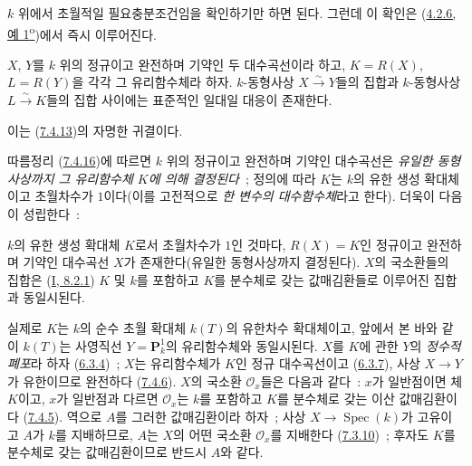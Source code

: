 
$k$ 위에서 초월적일 필요충분조건임을 확인하기만 하면 된다. 그런데 이 확인은
(\hyperref[II.4.2.6-ko]{4.2.6, 예 1\textsuperscript{o}})에서
즉시 이루어진다.

\begin{corollary}[7.4.16]
\label{II.7.4.16-ko}
$X$, $Y$를 $k$ 위의 정규이고 완전하며 기약인 두 대수곡선이라 하고,
$K=R(X)$, $L=R(Y)$을 각각 그 유리함수체라 하자. $k$-동형사상
$X\xrightarrow{\sim}Y$들의 집합과 $k$-동형사상
$L\xrightarrow{\sim}K$들의 집합 사이에는 표준적인 일대일 대응이
존재한다.
\end{corollary}

이는 (\hyperref[II.7.4.13-ko]{7.4.13})의 자명한 귀결이다.

\begin{env}[7.4.17]
\label{II.7.4.17-ko}
따름정리 (\hyperref[II.7.4.16-ko]{7.4.16})에 따르면 $k$ 위의 정규이고
완전하며 기약인 대수곡선은 \emph{유일한 동형사상까지 그 유리함수체
$K$에 의해 결정된다}~; 정의에 따라 $K$는 $k$의 유한 생성 확대체이고
초월차수가 $1$이다(이를 고전적으로 \emph{한 변수의 대수함수체}라고
한다). 더욱이 다음이 성립한다~:
\end{env}

\begin{proposition}[7.4.18]
\label{II.7.4.18-ko}
$k$의 유한 생성 확대체 $K$로서 초월차수가 $1$인 것마다, $R(X)=K$인
정규이고 완전하며 기약인 대수곡선 $X$가 존재한다(유일한 동형사상까지
결정된다). $X$의 국소환들의 집합은 (\hyperref[I.8.2.1-ko]{I, 8.2.1})
$K$ 및 $k$를 포함하고 $K$를 분수체로 갖는 값매김환들로 이루어진
집합과 동일시된다.
\end{proposition}

실제로 $K$는 $k$의 순수 초월 확대체 $k(T)$의 유한차수 확대체이고,
앞에서 본 바와 같이 $k(T)$는 사영직선 $Y=\mathbf{P}_k^1$의
유리함수체와 동일시된다. $X$를 $K$에 관한 $Y$의 \emph{정수적 폐포}라
하자 (\hyperref[II.6.3.4-ko]{6.3.4})~; $X$는 유리함수체가 $K$인 정규
대수곡선이고 (\hyperref[II.6.3.7-ko]{6.3.7}), 사상 $X\to Y$가
유한이므로 완전하다 (\hyperref[II.7.4.6-ko]{7.4.6}). $X$의 국소환
$\mathcal{O}_x$들은 다음과 같다~: $x$가 일반점이면 체 $K$이고, $x$가
일반점과 다르면 $\mathcal{O}_x$는 $k$를 포함하고 $K$를 분수체로 갖는
이산 값매김환이다 (\hyperref[II.7.4.5-ko]{7.4.5}). 역으로 $A$를 그러한
값매김환이라 하자~; 사상 $X\to\operatorname{Spec}(k)$가 고유이고
$A$가 $k$를 지배하므로, $A$는 $X$의 어떤 국소환 $\mathcal{O}_x$를
지배한다 (\hyperref[II.7.3.10-ko]{7.3.10})~; 후자도 $K$를 분수체로 갖는
값매김환이므로 반드시 $A$와 같다.

